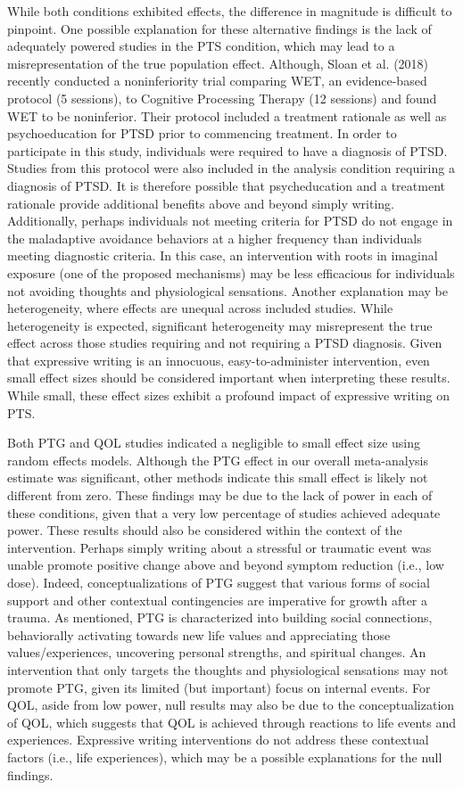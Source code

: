 \documentclass[man]{apa6}
\theoremstyle{definition}
\theoremstyle{definition}
\theoremstyle{definition}
\theoremstyle{remark}
\begin{document}
While both conditions exhibited effects, the difference in magnitude is
difficult to pinpoint. One possible explanation for these alternative
findings is the lack of adequately powered studies in the PTS condition,
which may lead to a misrepresentation of the true population effect.
Although, Sloan et al. (2018) recently conducted a noninferiority trial
comparing WET, an evidence-based protocol (5 sessions), to Cognitive
Processing Therapy (12 sessions) and found WET to be noninferior. Their
protocol included a treatment rationale as well as psychoeducation for
PTSD prior to commencing treatment. In order to participate in this
study, individuals were required to have a diagnosis of PTSD. Studies
from this protocol were also included in the analysis condition
requiring a diagnosis of PTSD. It is therefore possible that
psycheducation and a treatment rationale provide additional benefits
above and beyond simply writing. Additionally, perhaps individuals not
meeting criteria for PTSD do not engage in the maladaptive avoidance
behaviors at a higher frequency than individuals meeting diagnostic
criteria. In this case, an intervention with roots in imaginal exposure
(one of the proposed mechanisms) may be less efficacious for individuals
not avoiding thoughts and physiological sensations. Another explanation
may be heterogeneity, where effects are unequal across included studies.
While heterogeneity is expected, significant heterogeneity may
misrepresent the true effect across those studies requiring and not
requiring a PTSD diagnosis. Given that expressive writing is an
innocuous, easy-to-administer intervention, even small effect sizes
should be considered important when interpreting these results. While
small, these effect sizes exhibit a profound impact of expressive
writing on PTS.

Both PTG and QOL studies indicated a negligible to small effect size
using random effects models. Although the PTG effect in our overall
meta-analysis estimate was significant, other methods indicate this
small effect is likely not different from zero. These findings may be
due to the lack of power in each of these conditions, given that a very
low percentage of studies achieved adequate power. These results should
also be considered within the context of the intervention. Perhaps
simply writing about a stressful or traumatic event was unable promote
positive change above and beyond symptom reduction (i.e., low dose).
Indeed, conceptualizations of PTG suggest that various forms of social
support and other contextual contingencies are imperative for growth
after a trauma. As mentioned, PTG is characterized into building social
connections, behaviorally activating towards new life values and
appreciating those values/experiences, uncovering personal strengths,
and spiritual changes. An intervention that only targets the thoughts
and physiological sensations may not promote PTG, given its limited (but
important) focus on internal events. For QOL, aside from low power, null
results may also be due to the conceptualization of QOL, which suggests
that QOL is achieved through reactions to life events and experiences.
Expressive writing interventions do not address these contextual factors
(i.e., life experiences), which may be a possible explanations for the
null findings.
\end{document}
